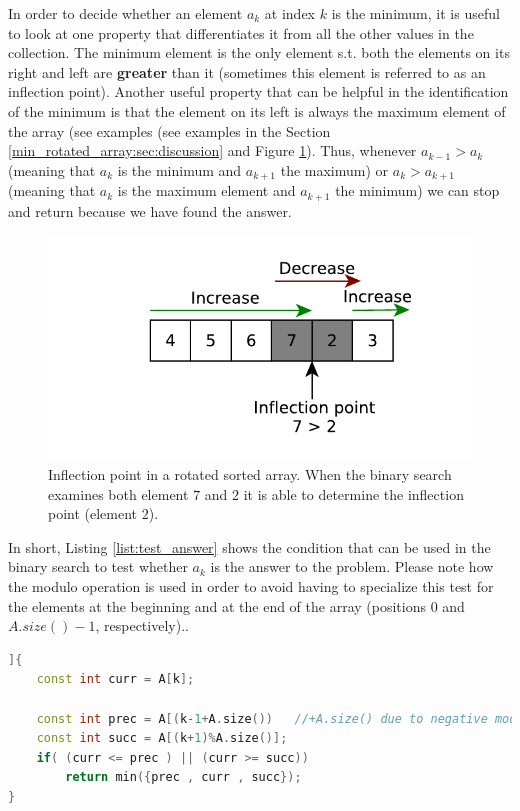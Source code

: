 In order to decide whether an element $a_k$ at index $k$ is the minimum, it is useful to look at one property that differentiates it from all the other values in the collection.
The minimum element is the only element s.t. both the elements on its right and left are \textbf{greater} than it (sometimes this element is referred to as an inflection point). 
Another useful property that can be helpful in the identification of the minimum is that the element on its left is always the maximum element of the array (see examples (see examples in the Section \ref{min_rotated_array:sec:discussion} and Figure \ref{fig:min_rotated_array:test_element}).
Thus, whenever $a_{k-1} > a_{k}$ (meaning that $a_k$ is the minimum and $a_{k+1}$ the maximum) or $a_{k} > a_{k+1}$ (meaning that $a_k$ is the maximum element and $a_{k+1}$ the minimum) we can stop and return because we have found the answer.

\begin{figure}
	\centering
	\includegraphics{sources/min_rotated_array/images/inflection_point}
	\caption{Inflection point in a rotated sorted array. When the binary search examines both element $7$ and $2$ it is able to determine the inflection point (element $2$). }
	\label{fig:min_rotated_array:test_element}
\end{figure}

In short, Listing \ref{list:test_answer} shows the condition that can be used in the binary search to test whether $a_k$ is the answer to the problem. Please note how the modulo operation is used in order to avoid having to specialize this test for the elements at the beginning and at the end of the array (positions $0$ and $A.size()-1$, respectively)..

\begin{lstlisting}[language=c++, caption={Test to verify whether the binary search can stop because an answer has been found.},label=list:test_answer]]{
	const int curr = A[k];

	const int prec = A[(k-1+A.size()) 	//+A.size() due to negative modulo
	const int succ = A[(k+1)%A.size()];
	if( (curr <= prec ) || (curr >= succ))
		return min({prec , curr , succ});
}
\end{lstlisting}

